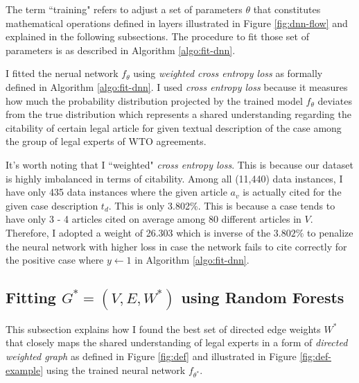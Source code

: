 \documentclass[12pt,letterpaper]{article}
\begin{document}
The term ``training" refers to adjust a set of parameters $\theta$
that constitutes mathematical operations defined in layers illustrated in Figure \ref{fig:dnn-flow} and explained in the following subsections.
The procedure to fit those set of parameters is as described in Algorithm \ref{algo:fit-dnn}.



I fitted the nerual network $f_\theta$ using \textit{weighted cross entropy loss} as formally defined in Algorithm \ref{algo:fit-dnn}.
I used \textit{cross entropy loss} because it measures how much the probability distribution projected by the trained model $f_\theta$
deviates from the true distribution which represents a shared understanding regarding the citability of certain legal article for given textual description of the case
among the group of legal experts of WTO agreements.

It's worth noting that I ``weighted" \textit{cross entropy loss}. This is because
our dataset is highly imbalanced in terms of citability.
Among all (11,440) data instances, I have only 435 data instances where the given article $a_v$ is actually cited for the given case description $t_d$. This is only 3.802\%.
This is because a case tends to have only 3 - 4 articles cited on average among 80 different articles in $V$.
Therefore, I adopted a weight of 26.303 which is inverse of the $3.802\%$ to penalize the neural network with higher loss in case the network fails to cite correctly for the positive case where $y \gets 1$ in Algorithm \ref{algo:fit-dnn}.



\subsection{Fitting $G^* = (V, E, W^*)$ using Random Forests}
This subsection explains how I found the best set of directed edge weights $W^*$ that closely maps the shared understanding of legal experts in a form of \textit{directed weighted graph} as defined in Figure \ref{fig:def} and illustrated in Figure \ref{fig:def-example} using the trained neural network $f_{\theta^*}$.
\end{document}
